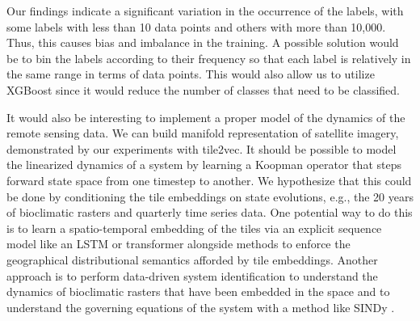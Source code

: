 Our findings indicate a significant variation in the occurrence of the labels, with some labels with less than 10 data points and others with more than 10,000. 
Thus, this causes bias and imbalance in the training.
A possible solution would be to bin the labels according to their frequency so that each label is relatively in the same range in terms of data points. 
This would also allow us to utilize XGBoost since it would reduce the number of classes that need to be classified.

It would also be interesting to implement a proper model of the dynamics of the remote sensing data.
We can build manifold representation of satellite imagery, demonstrated by our experiments with tile2vec.
It should be possible to model the linearized dynamics of a system by learning a Koopman operator that steps forward state space from one timestep to another.
We hypothesize that this could be done by conditioning the tile embeddings on state evolutions, e.g., the 20 years of bioclimatic rasters and quarterly time series data.
One potential way to do this is to learn a spatio-temporal embedding of the tiles via an explicit sequence model like an LSTM or transformer alongside methods to enforce the geographical distributional semantics afforded by tile embeddings.
Another approach is to perform data-driven system identification to understand the dynamics of bioclimatic rasters that have been embedded in the space and to understand the governing equations of the system with a method like SINDy \cite{brunton2016discovering}.